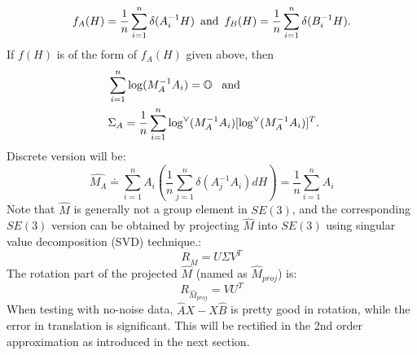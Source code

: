 \documentclass[twocolumn,10pt]{asme2ej}
\begin{document}
 $$ f_A(H) = \frac{1}{n} \sum_{i=1}^{n} \delta(A_i^{-1} H) \,\,\, {\rm and} \,\,\, f_B(H) = \frac{1}{n} \sum_{i=1}^{n} \delta(B_i^{-1} H). $$
 If $f(H)$ is of the form of $f_A(H)$ given above, then
\begin{equation} \
\begin{split} &\sum_{i=1}^{n} \log(M_A^{-1} A_i) = \mathbb{O} {\rm \,\,\,\,\, and} \\
&\Sigma_A = \frac{1}{n} \sum_{i=1}^{n} \log^{\vee}(M_A^{-1} A_i) [\log^{\vee}(M_A^{-1} A_i)]^T.  
\label{datameancovconvdef} 
\end{split}
\end{equation}
Discrete version will be:
\begin{equation}
\widehat{M_{A}} \doteq \sum_{i=1}^{n} A_{i} \left( \frac{1}{n} \sum_{j=1}^{n}  \delta(A_j^{-1} A_{i})dH \right) = \dfrac{1}{n}\sum_{i=1}^{n}A_{i}
\label{1stmean}
\end{equation}
Note that $\widehat{M}$ is generally not a group element in $SE(3)$, and the corresponding $SE(3)$ version can be obtained by projecting $\widehat{M}$ into $SE(3)$ using singular value decomposition (SVD) technique.:
\begin{equation}
R_{\widehat{M}} = U \Sigma V^{T}
\label{proj}
\end{equation}
The rotation part of the projected $\widehat{M}$ (named as $\widehat{M}_{proj}$) is:
\begin{equation}
R_{\widehat{M}_{proj}} = VU^{T}
\label{1storth}
\end{equation}
When testing with no-noise data, $\hat{A}X - X\hat{B}$ is pretty good in rotation, while the error in translation is significant. This will be rectified in the 2nd order approximation as introduced in the next section.
\end{document}

